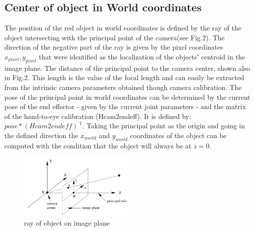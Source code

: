 \documentclass[letterpaper, 10 pt, conference]{ieeeconf}  %
\begin{document}
\subsection{Center of object in World coordinates}

The position of the red object in world coordinates is defined by the ray of the object intersecting with the principal point of the camera(see Fig.2). The direction of the negative part of the ray is given by the pixel coordinates $x_{pixel},y_{pixel}$ that were identified as the localization of the objects' centroid in the image plane. The distance of the principal point to the camera center, shown also in Fig.2. This length is the value of the focal length and can easily be extracted from the intrinsic camera parameters obtained though camera calibration. The pose of the principal point in world coordinates can be determined by the current pose of the end effector - given by the current joint parameters - and the matrix of the hand-to-eye calibration (Hcam2endeff). It is defined by: $pose*(Hcam2endeff)^{⁻1}$. Taking the principal point as the origin and going in the defined direction the $x_{world}$ and $y_{world}$ coordinates of the object can be computed with the condition that the object will always be at $z=0$.  
\begin{figure}
\includegraphics[width=0.5\textwidth]{DaniLLL.jpg}
\caption*{\label{fig:finding target position}ray of object on image plane}
\end{figure}

\end{document}
